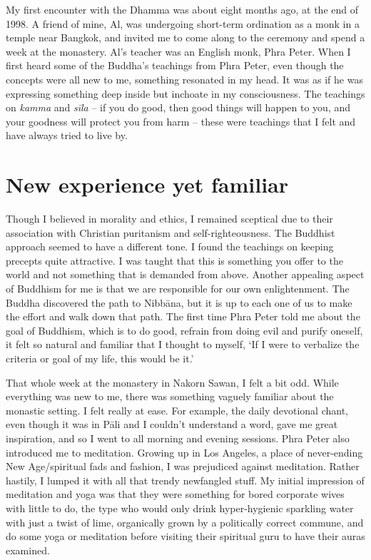 
My first encounter with the Dhamma was about eight months ago, at the
end of 1998. A friend of mine, Al, was undergoing short-term ordination
as a monk in a temple near Bangkok, and invited me to come along to the
ceremony and spend a week at the monastery. Al's teacher was an English
monk, Phra Peter. When I first heard some of the Buddha's teachings from
Phra Peter, even though the concepts were all new to me, something
resonated in my head. It was as if he was expressing something deep
inside but inchoate in my consciousness. The teachings on \emph{kamma}
and \emph{sīla} -- if you do good, then good things will happen to you, 
and your goodness will protect you from harm -- these were teachings
that I felt and have always tried to live by. 

\section{New experience yet familiar}

Though I believed in morality and ethics, I remained sceptical due to
their association with Christian puritanism and self-righteousness. The
Buddhist approach seemed to have a different tone. I found the teachings
on keeping precepts quite attractive. I was taught that this is
something you offer to the world and not something that is demanded from
above. Another appealing aspect of Buddhism for me is that we are
responsible for our own enlightenment. The Buddha discovered the path to
Nibbāna, but it is up to each one of us to make the effort and walk down
that path. The first time Phra Peter told me about the goal of Buddhism, 
which is to do good, refrain from doing evil and purify oneself, it felt
so natural and familiar that I thought to myself, `If I were to
verbalize the criteria or goal of my life, this would be it.'

That whole week at the monastery in Nakorn Sawan, I felt a bit odd. 
While everything was new to me, there was something vaguely familiar
about the monastic setting. I felt really at ease. For example, the
daily devotional chant, even though it was in Pāli and I couldn't
understand a word, gave me great inspiration, and so I went to all
morning and evening sessions. Phra Peter also introduced me to
meditation. Growing up in Los Angeles, a place of never-ending New
Age/spiritual fads and fashion, I was prejudiced against meditation. 
Rather hastily, I lumped it with all that trendy newfangled stuff. My
initial impression of meditation and yoga was that they were something
for bored corporate wives with little to do, the type who would only
drink hyper-hygienic sparkling water with just a twist of lime, 
organically grown by a politically correct commune, and do some yoga or
meditation before visiting their spiritual guru to have their auras
examined. 

